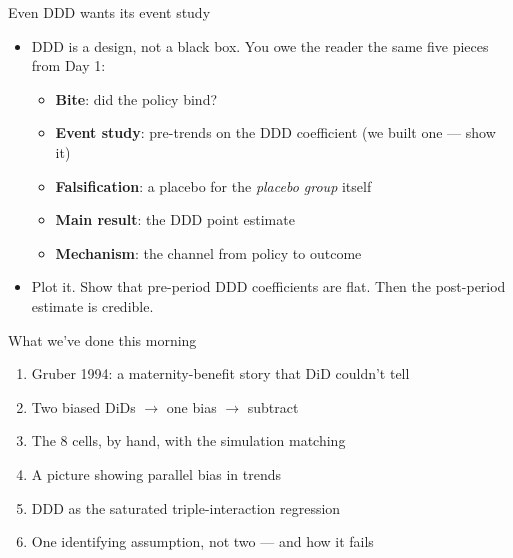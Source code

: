 \documentclass[aspectratio=169,11pt]{beamer}
\begin{document}
\begin{frame}{Even DDD wants its event study}
\vspace{0.4em}
\begin{itemize}
  \item DDD is a design, not a black box. You owe the reader the same five pieces from Day 1:
  \begin{itemize}\small
    \item[--] \textbf{Bite}: did the policy bind?
    \item[--] \textbf{Event study}: pre-trends on the DDD coefficient (we built one --- show it)
    \item[--] \textbf{Falsification}: a placebo for the \textit{placebo group} itself
    \item[--] \textbf{Main result}: the DDD point estimate
    \item[--] \textbf{Mechanism}: the channel from policy to outcome
  \end{itemize}
  \item {} Plot it. Show that pre-period DDD coefficients are flat. Then the post-period estimate is credible.
\end{itemize}
\end{frame}


\begin{frame}{What we've done this morning}
\vspace{0.3em}
\begin{enumerate}
  \item Gruber 1994: a maternity-benefit story that DiD couldn't tell
  \item Two biased DiDs $\rightarrow$ one bias $\rightarrow$ subtract
  \item The 8 cells, by hand, with the simulation matching
  \item A picture showing parallel bias in trends
  \item DDD as the saturated triple-interaction regression
  \item One identifying assumption, not two --- and how it fails
\end{enumerate}
\end{frame}
\end{document}
